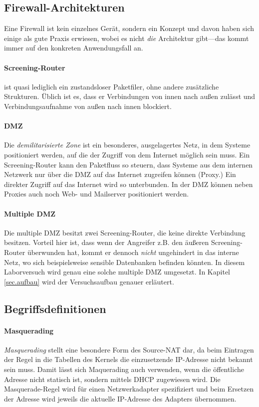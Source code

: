 \subsection{Firewall-Architekturen}

Eine Firewall ist kein einzelnes Gerät, sondern ein Konzept und davon
haben sich einige als gute Praxis erwiesen, wobei es nicht \emph{die}
Architektur gibt---das kommt immer auf den konkreten Anwendungsfall an.

\paragraph{Screening-Router} ist quasi lediglich ein zustandsloser
Paketfiler, ohne andere zusätzliche Strukturen. Üblich ist es, dass er
Verbindungen von innen nach außen zulässt und Verbindungsaufnahme von
außen nach innen blockiert.\cite{iptables}

\paragraph{DMZ}
Die \emph{demilitarisierte Zone} ist ein besonderes, ausgelagertes Netz,
in dem Systeme positioniert werden, auf die der Zugriff von dem Internet
möglich sein muss. Ein Screening-Router kann den Paketfluss so steuern,
dass Systeme aus dem internen Netzwerk nur über die DMZ auf das Internet
zugreifen können (Proxy.) Ein direkter Zugriff auf das Internet wird so
unterbunden. In der DMZ können neben Proxies auch noch Web- und Mailserver
positioniert werden.\cite{iptables}

\paragraph{Multiple DMZ} Die multiple DMZ besitzt zwei Screening-Router,
die keine direkte Verbindung besitzen. Vorteil hier ist, dass wenn der
Angreifer z.B. den äußeren Screening-Router überwunden hat, kommt er dennoch
\emph{nicht} ungehindert in das interne Netz, wo sich beispielsweise
sensible Datenbanken befinden könnten.\cite{iptables}
In diesem Laborversuch wird genau eine solche multiple DMZ umgesetzt.
In Kapitel \ref{sec.aufbau} wird der Versuchsaufbau genauer erläutert.


\subsection{Begriffsdefinitionen}\label{sec.begriffe}

\paragraph{Masquerading}
\emph{Masquerading} stellt eine besondere Form des Source-NAT dar, da beim
Eintragen der Regel in die Tabellen des Kernels die einzusetzende IP-Adresse
nicht bekannt sein muss.
Damit lässt sich Maquerading auch verwenden, wenn die öffentliche Adresse nicht
statisch ist, sondern mittels DHCP zugewiesen wird.
Die Masquerade-Regel wird für einen Netzwerkadapter spezifiziert und beim
Ersetzen der Adresse wird jeweils die aktuelle IP-Adresse des Adapters
übernommen.


